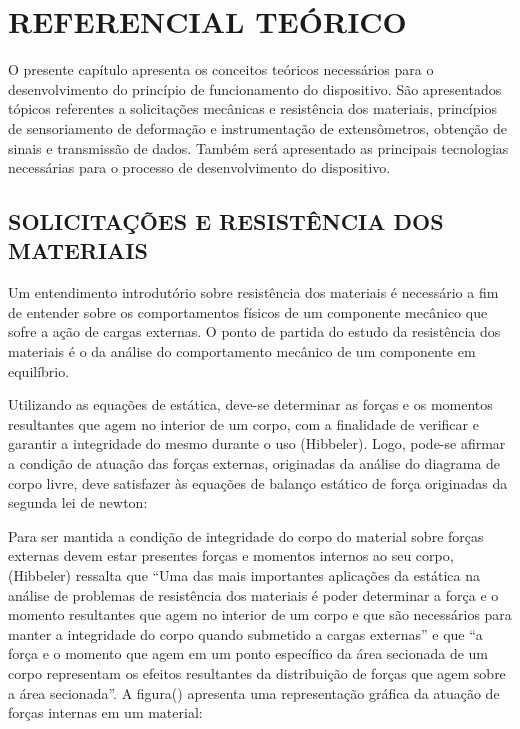 
\chapter{REFERENCIAL TEÓRICO}\label{cap:REFERENCIAL TEÓRICO}

O presente capítulo apresenta os conceitos teóricos necessários para o desenvolvimento do princípio de funcionamento do dispositivo. São apresentados tópicos referentes a solicitações mecânicas e resistência dos materiais, princípios de sensoriamento de deformação e instrumentação de extensômetros, obtenção de sinais e transmissão de dados. Também será apresentado as principais tecnologias necessárias para o processo de desenvolvimento do dispositivo.

\section{SOLICITAÇÕES E RESISTÊNCIA DOS MATERIAIS}

Um entendimento introdutório sobre resistência dos materiais é necessário a fim de entender sobre os comportamentos físicos de um componente mecânico que sofre a ação de cargas externas. O ponto de partida do estudo da resistência dos materiais é o da análise do comportamento mecânico de um componente em equilíbrio.

Utilizando as equações de estática, deve-se determinar as forças e os momentos resultantes que agem no interior de um corpo, com a finalidade de verificar e garantir a integridade do mesmo durante o uso (Hibbeler). Logo, pode-se afirmar a condição de atuação das forças externas, originadas da análise do diagrama de corpo livre, deve satisfazer às equações de balanço estático de força originadas da segunda lei de newton:



Para ser mantida a condição de integridade do corpo do material sobre forças externas devem estar presentes forças e momentos internos ao seu corpo, (Hibbeler) ressalta que “Uma das mais importantes aplicações da estática na análise de problemas de resistência dos materiais é poder determinar a força e o momento resultantes que agem no interior de um corpo e que são necessários para manter a integridade do corpo quando submetido a cargas externas” e que “a força e o momento que agem em um ponto específico da área secionada de um corpo representam os efeitos resultantes da distribuição de forças que agem sobre a área secionada”. A figura() apresenta uma representação gráfica da atuação de forças internas em um material:

